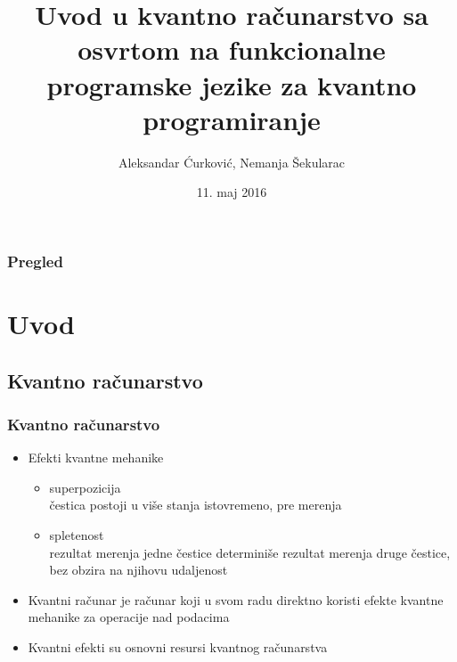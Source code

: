 \documentclass[12pt,hyperref={unicode}]{beamer}
\title[Short title]{Uvod u kvantno računarstvo sa osvrtom na funkcionalne programske jezike za kvantno programiranje} %
\author{Aleksandar Ćurković, Nemanja Šekularac} %
\institute %
{
Matematički fakultet \\ %
\medskip
\textit{nsekularac@gmail.com, curkovical@gmail.com} %
}
\date{11. maj 2016} %
\begin{document}
\begin{frame}
\titlepage %
\end{frame}

\begin{frame}
\frametitle{Pregled} %
\tableofcontents %
\end{frame}


\section{Uvod} %

\subsection{Kvantno računarstvo}%


\begin{frame}
\frametitle{Kvantno računarstvo}
\begin{itemize}

\item{Efekti kvantne mehanike}
	\begin{itemize}
    \item{superpozicija}\\
	čestica postoji u više stanja istovremeno, pre merenja
    \item{spletenost}\\
	rezultat merenja jedne čestice determiniše rezultat merenja druge čestice, bez obzira na njihovu udaljenost
    \end{itemize}
\item{Kvantni računar je računar koji u svom radu direktno koristi efekte kvantne mehanike za operacije nad podacima}
\item{Kvantni efekti su osnovni resursi kvantnog računarstva}
\end{itemize}

\end{frame}
\end{document}

